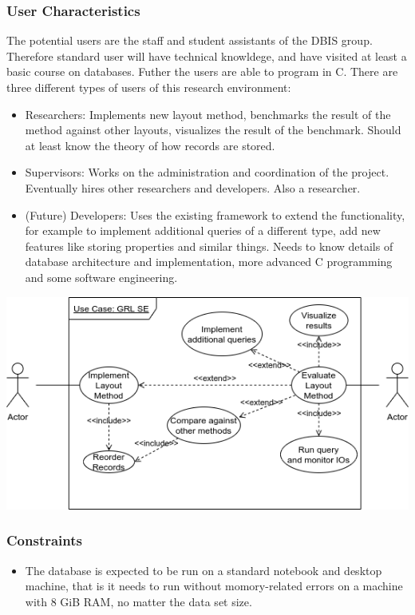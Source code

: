 	\subsubsection{User Characteristics}
		The potential users are the staff and student assistants of the DBIS group. Therefore standard user will have technical knowldege, and have visited at least a basic course on databases. Futher the users are able to program in C.
		There are three different types of users of this research environment: \\
		\begin{itemize}
			\item Researchers: Implements new layout method, benchmarks the result of the method against other layouts, visualizes the result of the benchmark. Should at least know the theory of how records are stored.
			
		 	\item Supervisors: Works on the administration and coordination of the project. Eventually hires other researchers and developers. Also a researcher.
		 	\item (Future) Developers: Uses the existing framework to extend the functionality, for example to implement additional queries of a different type, add new features like storing properties and similar things. Needs to know details of database architecture and implementation, more advanced C programming and some software engineering.
		\end{itemize}
		\begin{center}
		 \includegraphics[keepaspectratio,width=\textwidth]{img/use_case.png}
		\end{center}

		

	\subsubsection{Constraints}
		\begin{itemize}
			\item The database is expected to be run on a standard notebook and desktop machine, that is it needs to run without momory-related errors on a machine with 8 GiB RAM, no matter the data set size.
		\end{itemize}

